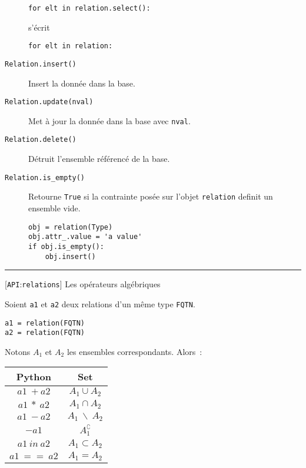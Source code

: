 \documentclass[a4paper]{letter}
\newcommand{\subsection}[2]{
\rule{0.5cm}{0.1pt} {\scriptsize [{#1}]} {#2}
}
\newcommand{\API}{\texttt{API}}
\newcommand{\relations}{\texttt{relations}}
\begin{document}
\begin{multicols}{3}
\begin{description}
\begin{scriptsize}
\begin{verbatim}
for elt in relation.select():
\end{verbatim}
\end{scriptsize}
s'écrit
\begin{scriptsize}
\begin{verbatim}
for elt in relation:
\end{verbatim}
\end{scriptsize}
\item[\texttt{Relation.insert()}] Insert la donnée dans la base.
\item[\texttt{Relation.update(nval)}] Met à jour la donnée dans la base avec \texttt{nval}.
\item[\texttt{Relation.delete()}] Détruit l'ensemble référencé de la base.
\item[\texttt{Relation.is\_empty()}] Retourne \texttt{True} si la contrainte posée sur l'objet \texttt{relation} definit un ensemble vide.

\begin{scriptsize}
\begin{verbatim}
obj = relation(Type)
obj.attr_.value = 'a value'
if obj.is_empty():
    obj.insert()
\end{verbatim}
\end{scriptsize}
\end{description}



\subsection{\API:\relations}{Les opérateurs algébriques}

Soient \texttt{a1} et \texttt{a2} deux relations d'un même type \texttt{FQTN}.

\begin{scriptsize}
\begin{verbatim}
a1 = relation(FQTN)
a2 = relation(FQTN)
\end{verbatim}
\end{scriptsize}
Notons $A_{1}$ et $A_{2}$ les ensembles correspondants. Alors~:

\begin{center}
\begin{scriptsize}
\begin{tabular}{|c|c|}
\hline
Python & Set \\
\hline
$a1\ + a2$ & $A_{1} \cup A_{2}$ \\
$a1\ *\ a2$ & $A_{1} \cap A_{2}$ \\
$a1\ - a2$ & $A_{1}\ \backslash\ A_{2}$ \\
$-a1$ & $A_{1}^\complement$ \\
$a1\ in\ a2$ & $A_{1} \subset A_{2}$ \\
$a1\ ==\ a2$ & $A_{1} = A_{2}$ \\
\hline
\end{tabular}
\end{scriptsize}
\end{center}


\end{multicols}
\end{document}
